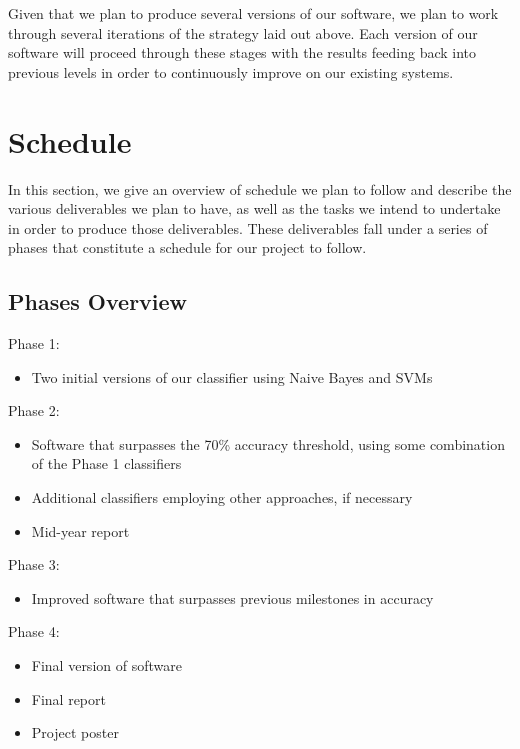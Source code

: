 \documentclass[cs,proposal]{hmcclinic}
\begin{document}
Given that we plan to produce several versions of our software, we plan to work through several iterations of the strategy laid out above. Each version of our software will proceed through these stages with the results feeding back into previous levels in order to continuously improve on our existing systems. 


\section{Schedule}

In this section, we give an overview of schedule we plan to follow and describe the various deliverables we plan to have, as well as the tasks we intend to undertake in order to produce those deliverables. These deliverables fall under a series of phases that constitute a schedule for our project to follow.

\subsection{Phases Overview}

Phase 1:
\begin{itemize} \itemsep0em
\item Two initial versions of our classifier using Naive Bayes and SVMs
\end{itemize}

\noindent Phase 2:
\begin{itemize} \itemsep0em
\item Software that surpasses the 70\% accuracy threshold, using some combination of the Phase 1 classifiers
\item Additional classifiers employing other approaches, if necessary
\item Mid-year report
\end{itemize}

\noindent Phase 3:
\begin{itemize} \itemsep0em
\item Improved software that surpasses previous milestones in accuracy
\end{itemize}

\noindent Phase 4:
\begin{itemize} \itemsep0em
\item Final version of software
\item Final report
\item Project poster
\end{itemize}
\end{document}
